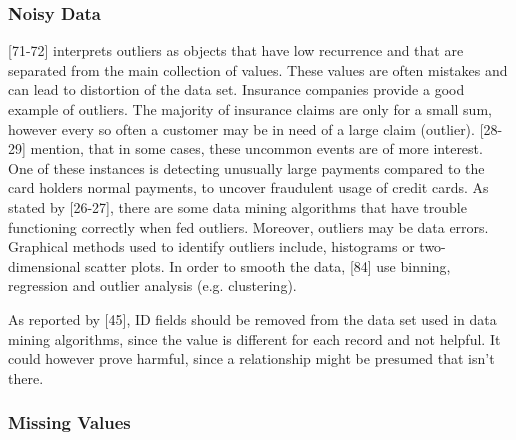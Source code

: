 \subsubsection{Noisy Data}
\label{section:NoisyData}
\textcite{dataPreparationForDataMining}[71-72] interprets outliers as objects that have low recurrence and that are separated from the main collection of values. These values are often mistakes and can lead to distortion of the data set. Insurance companies provide a good example of outliers. The majority of insurance claims are only for a small sum, however every so often a customer may be in need of a large claim (outlier). \textcite{han2011data}[28-29] mention, that in some cases, these uncommon events are of more interest. One of these instances is detecting unusually large payments compared to the card holders normal payments, to uncover fraudulent usage of credit cards. As stated by \textcite{DataMiningAndPredictiveAnalytics}[26-27], there are some data mining algorithms that have trouble functioning correctly when fed outliers. Moreover, outliers may be data errors. Graphical methods used to identify outliers include, histograms or two-dimensional scatter plots. In order to smooth the data, \textcite{han2011data}[84] use binning, regression and outlier analysis (e.g. clustering).



As reported by \textcite{DataMiningAndPredictiveAnalytics}[45], ID fields should be removed from the data set used in data mining algorithms, since the value is different for each record and not helpful. It could however prove harmful, since a relationship might be presumed that isn't there.


\subsubsection{Missing Values}
\label{section:MissingValues}

